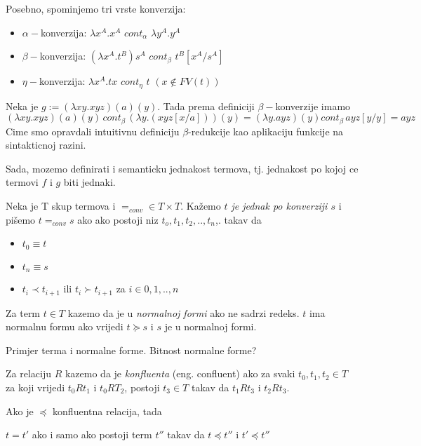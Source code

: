 Posebno, spominjemo tri vrste konverzija:
\begin{itemize}
  \item $\alpha-$konverzija: $\lambda x^A . x^A $ $cont_\alpha$ $\lambda y^A . y^A$
  \item $\beta-$konverzija: $(\lambda x^A . t^B) s^A$ $cont_\beta$ $t^B[x^A/s^A]$
  \item $\eta-$konverzija: $\lambda x^A . t x $ $cont_\eta$ $t$ $(x \not\in FV(t))$
\end{itemize} 

\begin{example}
  Neka je $g := (\lambda x y . x y z) (a) (y)$. Tada prema definiciji $\beta-$konverzije imamo
  \begin{equation*}
    (\lambda x y . x y z) (a) (y)\, cont_\beta \,(\lambda y. (x y z [x/a])) (y)  = (\lambda y.a y z) (y) cont_\beta \, a y z [y / y]  = a y z
  \end{equation*}
  Cime smo opravdali intuitivnu definiciju $\beta$-redukcije kao aplikaciju funkcije na sintakticnoj razini.
\end{example}

Sada, mozemo definirati i semanticku jednakost termova, tj. jednakost po kojoj ce termovi $f$ i $g$ biti jednaki.

\begin{definition}
  Neka je T skup termova i $=_{conv} \in T \times T$. Kažemo \emph{$t$ je jednak po konverziji $s$} i pišemo $t =_{conv} s$ ako ako postoji niz $t_o, t_1, t_2, .., t_n$,. takav da
  \begin{itemize}
    \item $t_0 \equiv t$
    \item $t_n \equiv s$
    \item $t_i \prec t_{i+1}$ ili $t_i \succ t_{i+1}$ za $i \in {0, 1, .., n}$
  \end{itemize}
\end{definition}

\begin{definition}
  Za term $t \in T$ kazemo da je u \emph{normalnoj formi} ako ne sadrzi redeks. $t$ ima normalnu formu ako vrijedi $t \succeq s$ i $s$ je u normalnoj formi.
\end{definition}

\begin{example}
  Primjer terma i normalne forme. Bitnost normalne forme?
\end{example}

\begin{definition}
  Za relaciju $R$ kazemo da je \emph{konfluenta} (eng. confluent) ako za svaki $t_0, t_1, t_2 \in T$ za koji vrijedi $t_0 R t_1$ i $t_0 R T_2$, postoji $t_3 \in T$ takav da $t_1 R t_3$ i $t_2 R t_3$.
\end{definition}


\begin{teorem}
  Ako je $\preceq$ konfluentna relacija, tada
  \begin{center}
    $t = t'$ ako i samo ako postoji term $t''$ takav da $t \preceq t''$ i $t' \preceq t''$
  \end{center}
\end{teorem}

\begin{definition}
\end{definition}
